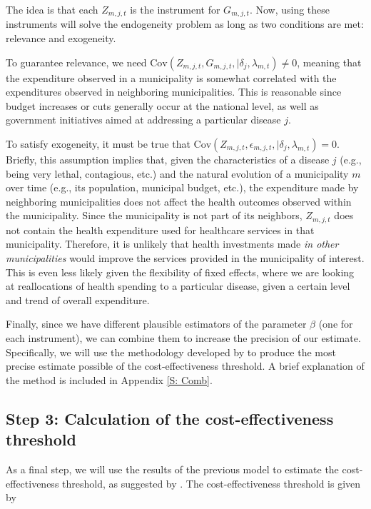 \documentclass[11pt]{article}
\numberwithin{equation}{section}
\theoremstyle{remark}
\begin{document}
The idea is that each \(Z_{m,j,t}\) is the instrument for \(G_{m,j,t}\). Now, using these instruments will solve the endogeneity problem as long as two conditions are met: relevance and exogeneity.

To guarantee relevance, we need \(\text{Cov}(Z_{m,j,t},G_{m,j,t},|\delta_j,\lambda_{m,t}) \neq 0\), meaning that the expenditure observed in a municipality is somewhat correlated with the expenditures observed in neighboring municipalities. This is reasonable since budget increases or cuts generally occur at the national level, as well as government initiatives aimed at addressing a particular disease \(j\).

To satisfy exogeneity, it must be true that \(\text{Cov}(Z_{m,j,t},\epsilon_{m,j,t},|\delta_j,\lambda_{m,t}) = 0\). Briefly, this assumption implies that, given the characteristics of a disease \(j\) (e.g., being very lethal, contagious, etc.) and the natural evolution of a municipality \(m\) over time (e.g., its population, municipal budget, etc.), the expenditure made by neighboring municipalities does not affect the health outcomes observed within the municipality. Since the municipality is not part of its neighbors, \(Z_{m,j,t}\) does not contain the health expenditure used for healthcare services in that municipality. Therefore, it is unlikely that health investments made \emph{in other municipalities} would improve the services provided in the municipality of interest. This is even less likely given the flexibility of fixed effects, where we are looking at reallocations of health spending to a particular disease, given a certain level and trend of overall expenditure.

Finally, since we have different plausible estimators of the parameter \(\beta\) (one for each instrument), we can combine them to increase the precision of our estimate. Specifically, we will use the methodology developed by \citet{Lavancier2016} to produce the most precise estimate possible of the cost-effectiveness threshold. A brief explanation of the method is included in Appendix \ref{S: Comb}.

\subsection{Step 3: Calculation of the cost-effectiveness threshold}

As a final step, we will use the results of the previous model to estimate the cost-effectiveness threshold, as suggested by \citet{Claxton2015}. The cost-effectiveness threshold is given by
\end{document}
